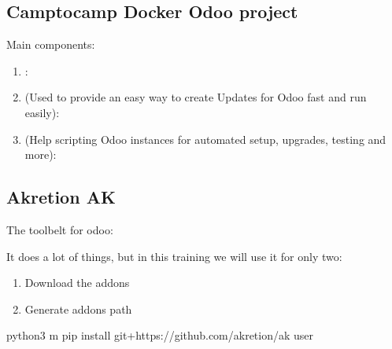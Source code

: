 \documentclass[letterpaper,10pt,english]{sphinxmanual}
\begin{document}
\subsection{Camptocamp \sphinxhyphen{} Docker Odoo project}
\label{\detokenize{technical:camptocamp-docker-odoo-project}}
Main components:
\begin{enumerate}
%
\item {} 
: 

\item {} 
 (Used to provide an easy way to create Updates for Odoo fast and run easily): 

\item {} 
 (Help scripting Odoo instances for automated setup, upgrades, testing and more): 

\end{enumerate}


\subsection{Akretion \sphinxhyphen{} AK}
\label{\detokenize{technical:akretion-ak}}
The toolbelt for odoo: 

It does a lot of things, but in this training we will use it for only two:
\begin{enumerate}
%
\item {} 
Download the addons

\item {} 
Generate addons path

\end{enumerate}

\begin{sphinxVerbatim}[commandchars=\\\{\}]
python3 \PYGZhy{}m pip install git+https://github.com/akretion/ak \PYGZhy{}\PYGZhy{}user
\end{sphinxVerbatim}
\end{document}
